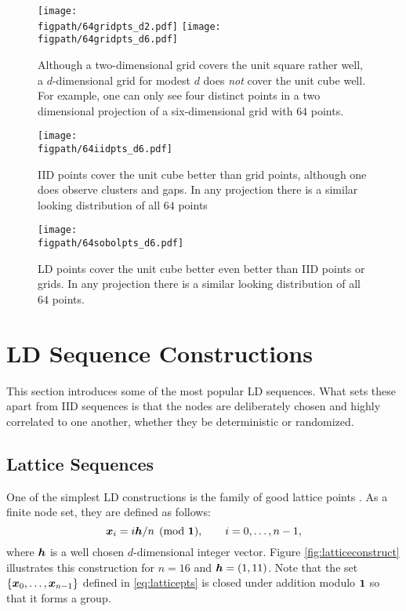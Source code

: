 \documentclass{svproc}
\newcommand{\figpath}{Figures}
\begin{document}
\begin{figure}
	\centering
	\texttt{[image: \\figpath/64gridpts\_d2.pdf]}\quad
	\texttt{[image: \\figpath/64gridpts\_d6.pdf]}
	\caption{Although a two-dimensional grid covers the unit square rather well, a $d$-dimensional grid for modest $d$ does \emph{not} cover the unit cube well.  For example, one can only see four distinct points in a two dimensional projection of a six-dimensional grid with $64$ points. \label{fig:grid}}
\end{figure}

\begin{figure}
	\centering
	\texttt{[image: \\figpath/64iidpts\_d6.pdf]}
	\caption{IID points cover the unit cube better than grid points, although one does observe clusters and gaps.  In any  projection there is  a similar looking distribution of all $64$ points \label{fig:iid}}
\end{figure}

\begin{figure}
	\centering
	\texttt{[image: \\figpath/64sobolpts\_d6.pdf]}
	\caption{LD points cover the unit cube better even better than IID points or grids.  In any  projection there is  a similar looking distribution of all $64$ points. \label{fig:ld}}
\end{figure}


\section{LD Sequence Constructions} \label{sec:construct}
This section introduces some of the most popular LD sequences.  What sets these apart from IID sequences is that the nodes are deliberately chosen and highly correlated to one another, whether they be deterministic or randomized.

\subsection{Lattice Sequences} \label{sec:lattice}
One of the simplest LD constructions is the family of good lattice points \cite{DicEtal22a,SloJoe94}.  As a finite node set, they are defined as follows:
\begin{equation} \label{eq:latticepts}
	{\boldsymbol{x}}_i = i{\boldsymbol{h}}/n \pmod {{\boldsymbol{1}}}, \qquad i = 0, \ldots, n-1,
\end{equation}
where ${\boldsymbol{h}}$ is a well chosen $d$-dimensional integer vector. Figure \ref{fig:latticeconstruct} illustrates this construction for $n = 16$ and ${\boldsymbol{h}} = (1,11)$.  Note that the set $\{{\boldsymbol{x}}_0, \ldots, {\boldsymbol{x}}_{n-1}\}$ defined in \eqref{eq:latticepts} is closed under addition modulo ${\boldsymbol{1}}$ so that it forms a group.
\end{document}
